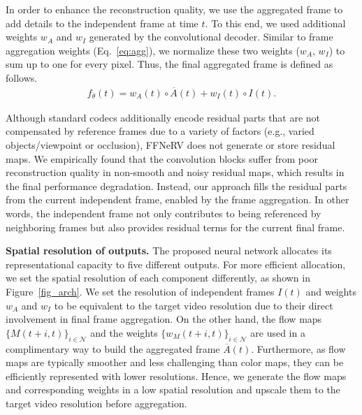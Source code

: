 \documentclass[sigconf]{acmart}
\begin{document}
In order to enhance the reconstruction quality, we use the aggregated frame to add details to the independent frame at time $t$.
To this end, we used additional weights $w_A$ and $w_I$ generated by the convolutional decoder.
Similar to frame aggregation weights (Eq.~\ref{eq:agg}), we normalize these two weights ($w_A$, $w_I$) to sum up to one for every pixel.
Thus, the final aggregated frame is defined as follows.
\begin{equation}
\label{eq_f}
\begin{gathered}
    f_\theta(t) = w_A(t) \circ \overline{A}(t) + w_I(t) \circ I(t).
\end{gathered}
\end{equation}


Although standard codecs additionally encode residual parts that are not compensated by reference frames due to a variety of factors (e.g., varied objects/viewpoint or occlusion), FFNeRV does not generate or store residual maps.
We empirically found that the convolution blocks suffer from poor reconstruction quality in non-smooth and noisy residual maps, which results in the final performance degradation.
Instead, our approach fills the residual parts from the current independent frame, enabled by the frame aggregation.
In other words, the independent frame not only contributes to being referenced by neighboring frames but also provides residual terms for the current final frame.


\noindent\textbf{Spatial resolution of outputs.}
The proposed neural network allocates its representational capacity to five different outputs.
For more efficient allocation, we set the spatial resolution of each component differently, as shown in Figure~\ref{fig_arch}.
We set the resolution of independent frames $I(t)$ and weights $w_A$ and $w_I$ to be equivalent to the target video resolution due to their direct involvement in final frame aggregation.
On the other hand, the flow maps $\{M(t+i,t)\}_{i \in \mathcal{N}}$ and the weights $\{w_M(t+i,t)\}_{i \in \mathcal{N}}$ are used in a complimentary way to build the aggregated frame $\overline{A}(t)$. 
Furthermore, as flow maps are typically smoother and less challenging than color maps, they can be efficiently represented with lower resolutions.
Hence, we generate the flow maps and corresponding weights in a low spatial resolution and upscale them to the target video resolution before aggregation.
\end{document}
